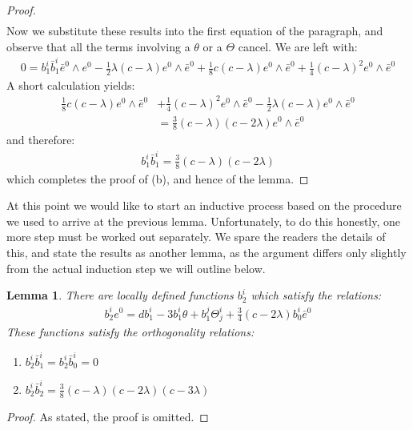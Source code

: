\documentclass[11pt]{amsart}
\newtheorem{lem}[subsection]{Lemma}
\theoremstyle{definition}
\theoremstyle{definition}
\begin{document}
\begin{proof}
\begin{align*}
\end{align*}
%
Now we substitute these results into the first equation of the paragraph, and observe that all the terms involving a $\theta$ or a $\Theta$ cancel.  We are left with:
%
\begin{align*}
0 = b^i_1 \bar{b}^i_1 \bar{e}^0 \wedge e^0 - \frac{1}{2} \lambda ( c - \lambda ) e^0 \wedge \bar{e}^0 + \frac{1}{8} c (c- \lambda) e^0 \wedge \bar{e}^0 + \frac{1}{4} (c - \lambda)^2 e^0 \wedge \bar{e}^0
\end{align*}
%
A short calculation yields:
%
\begin{align*}
\frac{1}{8} c (c- \lambda) e^0 \wedge \bar{e}^0 &+ \frac{1}{4} (c - \lambda)^2 e^0 \wedge \bar{e}^0 - \frac{1}{2} \lambda ( c - \lambda ) e^0 \wedge \bar{e}^0\\
&= \frac{3}{8}(c - \lambda)(c - 2 \lambda) e^0 \wedge \bar{e}^0
\end{align*}
%
and therefore:
%
\begin{align}
b^i_1 \bar{b}^i_1 = \frac{3}{8}(c - \lambda)(c - 2 \lambda)
\end{align}
%
which completes the proof of (b), and hence of the lemma.
%
\end{proof}

At this point we would like to start an inductive process based on the procedure we used to arrive at the previous lemma.  Unfortunately, to do this honestly, one more step must be worked out separately.  We spare the readers the details of this, and state the results as another lemma, as the argument differs only slightly from the actual induction step we will outline below.

\begin{lem} There are locally defined functions $b^i_2$ which satisfy the relations:
%
\begin{align*}
b^i_2 e^0 = d b^i_1 - 3 b^i_1 \theta + b^j_1 \Theta^i_j + \frac{3}{4}(c - 2 \lambda) b^i_0 \bar{e}^0
\end{align*}
%
These functions satisfy the orthogonality relations:
%
\begin{enumerate}
\item $b^i_2 \bar{b}^i_1 = b^i_2 \bar{b}^i_0 = 0$
\item $b^i_2 \bar{b}^i_2 = \frac{3}{8} (c - \lambda)(c - 2\lambda)(c - 3 \lambda)$
\end{enumerate}
%
\end{lem}

\begin{proof} As stated, the proof is omitted.
\end{proof}
\end{document}
